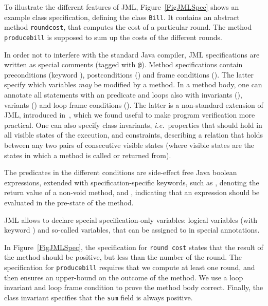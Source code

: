 To illustrate the different features of JML, Figure~\ref{FigJMLSpec}
shows an example class specification, defining the class
\texttt{Bill}. It contains an abstract method
\texttt{round\unsc cost}, that computes the cost of a particular
round. The method \texttt{produce\unsc bill} is supposed to sum up the
costs of the different rounds. 

In order not to interfere with the standard Java compiler, JML
specifications are written as special comments (tagged with
\texttt{@}). Method specifications contain preconditions (keyword
), postconditions () and frame
conditions (). The latter specify which variables
\emph{may} be modified by a method. In a method body, one can
annotate all statements with an  predicate and loops
also with invariants (), variants
() and loop frame conditions (). The latter is a non-standard extension of JML, introduced
in~\cite{BurdyRL03}, which we found useful to make program
verification more practical. One can also specify class invariants,
\emph{i.e.}\ properties that should hold in all visible states of the
execution, and constraints, describing a relation that 
holds between any two pairs of consecutive visible states (where
visible states are the states in which a method is called or returned
from).

The predicates in the different conditions are side-effect free Java
boolean expressions, extended with specification-specific keywords,
such as , denoting the return value of a non-void
method, and , indicating that an expression should be
evaluated in the pre-state of the method. 

JML allows to declare special specification-only variables: logical
variables (with keyword ) and so-called 
variables, that can be assigned to in special 
annotations.

In Figure~\ref{FigJMLSpec}, the specification for \texttt{round\unsc
cost} states that the result of the method should be positive, but
less than the number of the round. The specification for
\texttt{produce\unsc bill} requires that we compute at least one
round, and then ensures an upper-bound on the outcome of the
method. We use a loop invariant and loop frame condition to prove the
method body correct. Finally, the class invariant specifies that the
\texttt{sum} field is always positive.
     



